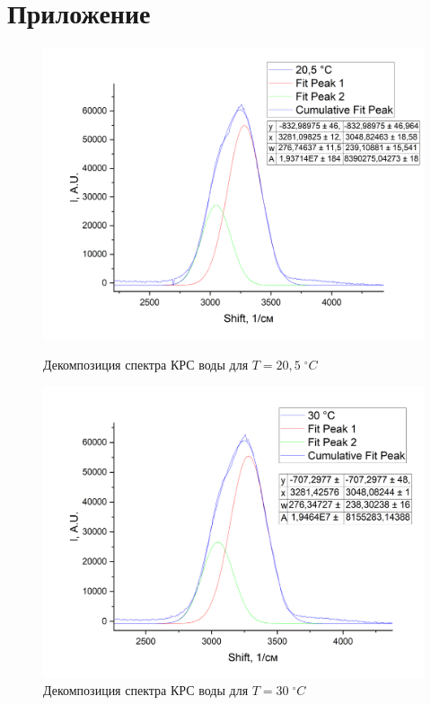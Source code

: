 \documentclass{article}
\begin{document}
\section{Приложение}
\begin{figure}[!htb]
                 \includegraphics[width=\linewidth]{Images/Вода; 20.png}
                 \caption{Декомпозиция спектра КРС воды для $T = 20,5 \; ^{\circ}C$}
                  \endminipage\hfill
                 \includegraphics[width=\linewidth]{Images/Вода; 30.png}
                 \caption{Декомпозиция спектра КРС воды для $T = 30 \; ^{\circ}C$}
                  \endminipage
\end{figure}
\end{document}
